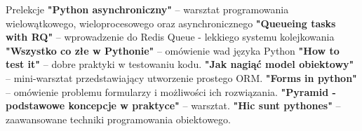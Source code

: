 \begin{rubric}{Prelekcje}
\entry*[PyConPL 2015]\textbf{"Python asynchroniczny"} -- warsztat
    programowania wielowątkowego, wieloprocesowego oraz asynchronicznego
\textbf{"Queueing tasks with RQ"} -- wprowadzenie do
    Redis Queue - lekkiego systemu kolejkowania
\entry*[PyConPL 2014]\textbf{"Wszystko co złe w Pythonie"} --
    omówienie wad języka Python
\entry*[PyConPL 2013]\textbf{"How to test it"} -- dobre praktyki w testowaniu
    kodu.
\entry*[4developers 2013]\textbf{"Jak nagiąć model obiektowy"} -- mini-warsztat
    przedstawiający utworzenie prostego ORM.
\entry*[PyConPL 2012]\textbf{"Forms in python"} -- omówienie problemu
    formularzy i możliwości ich rozwiązania.
\entry*[PyconPL 2012]\textbf{"Pyramid - podstawowe koncepcje w praktyce"} --
    warsztat.
\entry*[PyConPL 2011]\textbf{"Hic sunt pythones"} -- zaawansowane techniki
    programowania obiektowego.
\end{rubric}

